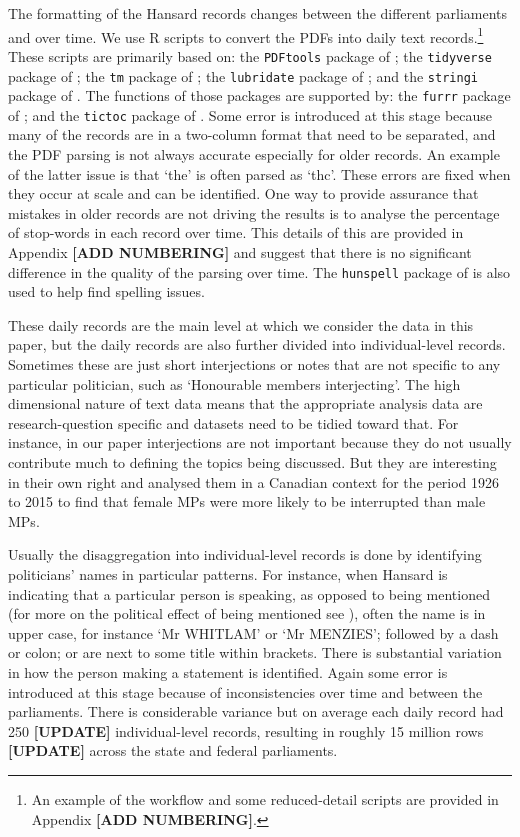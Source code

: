 \documentclass[12pt,]{article}
\theoremstyle{definition}
\theoremstyle{definition}
\theoremstyle{definition}
\theoremstyle{remark}
\begin{document}
The formatting of the Hansard records changes between the different
parliaments and over time. We use R scripts to convert the PDFs into
daily text records.\footnote{An example of the workflow and some
  reduced-detail scripts are provided in Appendix \textbf{{[}ADD
  NUMBERING{]}}.} These scripts are primarily based on: the
\texttt{PDFtools} package of \citet{Ooms2018pdftools}; the
\texttt{tidyverse} package of \citet{Wickham2017}; the \texttt{tm}
package of \citet{FeinererHornik2018}; the \texttt{lubridate} package of
\citet{GrolemundWickham2011}; and the \texttt{stringi} package of
\citet{Gagolewski2018}. The functions of those packages are supported
by: the \texttt{furrr} package of \citet{VaughanDancho2018}; and the
\texttt{tictoc} package of \citet{Izrailev2014}. Some error is
introduced at this stage because many of the records are in a two-column
format that need to be separated, and the PDF parsing is not always
accurate especially for older records. An example of the latter issue is
that `the' is often parsed as `thc'. These errors are fixed when they
occur at scale and can be identified. One way to provide assurance that
mistakes in older records are not driving the results is to analyse the
percentage of stop-words in each record over time. This details of this
are provided in Appendix \textbf{{[}ADD NUMBERING{]}} and suggest that
there is no significant difference in the quality of the parsing over
time. The \texttt{hunspell} package of \citet{Ooms2017} is also used to
help find spelling issues.

These daily records are the main level at which we consider the data in
this paper, but the daily records are also further divided into
individual-level records. Sometimes these are just short interjections
or notes that are not specific to any particular politician, such as
`Honourable members interjecting'. The high dimensional nature of text
data means that the appropriate analysis data are research-question
specific and datasets need to be tidied toward that. For instance, in
our paper interjections are not important because they do not usually
contribute much to defining the topics being discussed. But they are
interesting in their own right and \citet{Whyte2017} analysed them in a
Canadian context for the period 1926 to 2015 to find that female MPs
were more likely to be interrupted than male MPs.

Usually the disaggregation into individual-level records is done by
identifying politicians' names in particular patterns. For instance,
when Hansard is indicating that a particular person is speaking, as
opposed to being mentioned (for more on the political effect of being
mentioned see \citet{Alexander2018}), often the name is in upper case,
for instance `Mr WHITLAM' or `Mr MENZIES'; followed by a dash or colon;
or are next to some title within brackets. There is substantial
variation in how the person making a statement is identified. Again some
error is introduced at this stage because of inconsistencies over time
and between the parliaments. There is considerable variance but on
average each daily record had 250 \textbf{{[}UPDATE{]}} individual-level
records, resulting in roughly 15 million rows \textbf{{[}UPDATE{]}}
across the state and federal parliaments.
\end{document}
